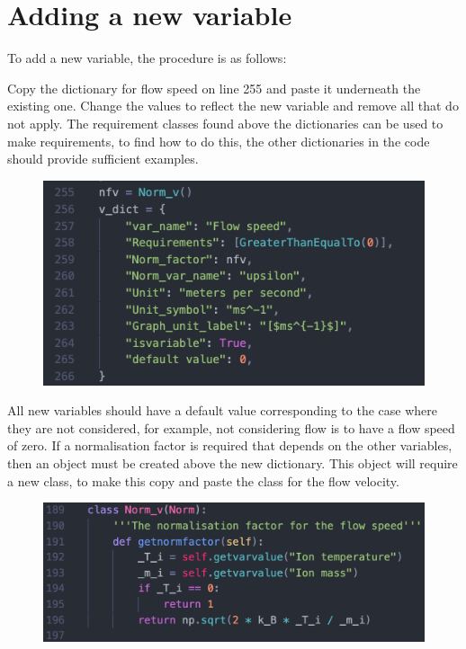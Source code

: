 \documentclass{journal}
\begin{document}
\section{Adding a new variable}

\smallskip

To add a new variable, the procedure is as follows:

\medskip

Copy the dictionary for flow speed on line 255 and paste it underneath the existing one. 
Change the values to reflect the new variable and remove all that do not apply. 
The requirement classes found above the dictionaries can be used to make requirements, to find how to do this, 
the other dictionaries in the code should provide sufficient examples. 

\begin{figure}[H]
\centering
\includegraphics[width=\linewidth]{Output/code1.jpeg}
\label{code1} 
\end{figure}

All new variables should have a default value corresponding to the case where they are not considered, 
for example, not considering flow is to have a flow speed of zero. If a normalisation factor is required 
that depends on the other variables, then an object must be created above the new dictionary. This object 
will require a new class, to make this copy and paste the class for the flow velocity.

\begin{figure}[H]
\centering
\includegraphics[width=\linewidth]{Output/code2.jpeg}
\label{code2} 
\end{figure}
\end{document}
